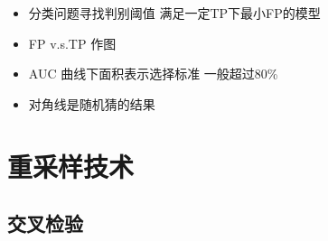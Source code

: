 \documentclass[]{book}
\providecommand{\tightlist}{%
  \setlength{\itemsep}{0pt}\setlength{\parskip}{0pt}}
\begin{document}
\begin{itemize}
\tightlist
\item
  分类问题寻找判别阈值 满足一定TP下最小FP的模型
\item
  FP v.s.TP 作图
\item
  AUC 曲线下面积表示选择标准 一般超过80\%
\item
  对角线是随机猜的结果
\end{itemize}

\hypertarget{ux91cdux91c7ux6837ux6280ux672f}{%
\section{重采样技术}\label{ux91cdux91c7ux6837ux6280ux672f}}

\hypertarget{ux4ea4ux53c9ux68c0ux9a8c}{%
\subsection{交叉检验}\label{ux4ea4ux53c9ux68c0ux9a8c}}
\end{document}
